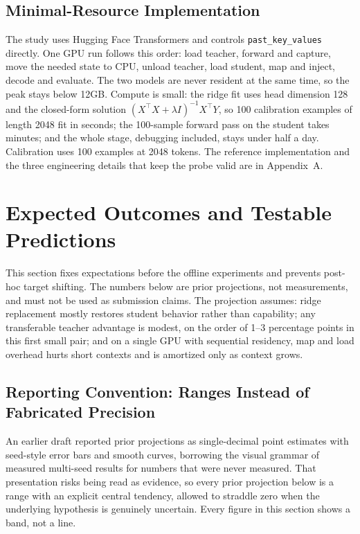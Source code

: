 \documentclass[10pt]{article}
\begin{document}
\subsection{Minimal-Resource Implementation}
The study uses Hugging Face Transformers and controls \texttt{past\_key\_values} directly. One GPU
run follows this order: load teacher, forward and capture, move the needed state to CPU, unload
teacher, load student, map and inject, decode and evaluate. The two models are never resident at
the same time, so the peak stays below 12GB. Compute is small: the ridge fit uses head dimension
128 and the closed-form solution $(X^\top X + \lambda I)^{-1}X^\top Y$, so 100 calibration
examples of length 2048 fit in seconds; the 100-sample forward pass on the student takes minutes;
and the whole stage, debugging included, stays under half a day. Calibration uses 100 examples at
2048 tokens. The reference implementation and the three engineering details that keep the probe
valid are in Appendix~A.

\section{Expected Outcomes and Testable Predictions}
This section fixes expectations before the offline experiments and prevents post-hoc target
shifting. The numbers below are prior projections, not measurements, and must not be used as
submission claims. The projection assumes: ridge replacement mostly restores student behavior
rather than capability; any transferable teacher advantage is modest, on the order of 1--3
percentage points in this first small pair; and on a single GPU with sequential residency, map and
load overhead hurts short contexts and is amortized only as context grows.

\subsection{Reporting Convention: Ranges Instead of Fabricated Precision}
An earlier draft reported prior projections as single-decimal point estimates with seed-style
error bars and smooth curves, borrowing the visual grammar of measured multi-seed results for
numbers that were never measured. That presentation risks being read as evidence, so every prior
projection below is a range with an explicit central tendency, allowed to straddle zero when the
underlying hypothesis is genuinely uncertain. Every figure in this section shows a band, not a
line.
\end{document}
